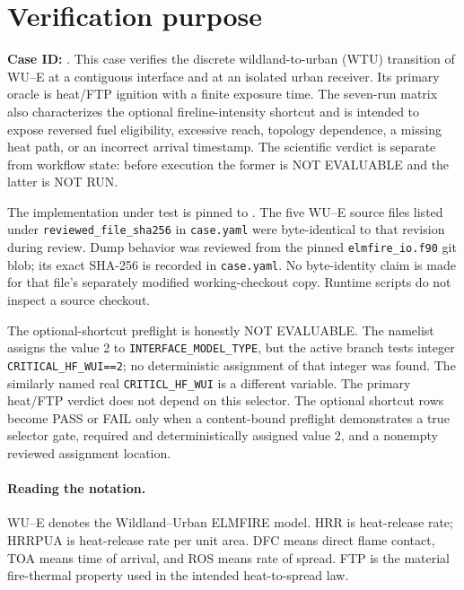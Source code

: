 \section{Verification purpose}

\textbf{Case ID:} \texttt{\CaseID}.  This case verifies the discrete
wildland-to-urban (WTU) transition of WU--E at a contiguous interface and at
an isolated urban receiver. Its primary oracle is heat/FTP ignition with a
finite exposure time. The seven-run matrix also characterizes the optional
fireline-intensity shortcut and is intended to expose reversed fuel
eligibility, excessive reach, topology dependence, a missing heat path, or an
incorrect arrival timestamp. The scientific verdict is separate from workflow state:
before execution the former is NOT EVALUABLE and the latter is NOT RUN.

The implementation under test is pinned to \SourceCommit. The five WU--E source
files listed under \texttt{reviewed\_file\_sha256} in \texttt{case.yaml} were
byte-identical to that revision during review.  Dump behavior was reviewed from
the pinned \texttt{elmfire\_io.f90} git blob; its exact SHA-256 is recorded in
\texttt{case.yaml}.  No byte-identity claim is made for that file's separately
modified working-checkout copy.  Runtime scripts do not inspect a source
checkout.

The optional-shortcut preflight is honestly NOT EVALUABLE. The namelist assigns the
value 2 to \texttt{INTERFACE\_MODEL\_TYPE}, but the active branch tests integer
\texttt{CRITICAL\_HF\_WUI==2}; no deterministic assignment of that integer was
found.  The similarly named real \texttt{CRITICL\_HF\_WUI} is a different
variable. The primary heat/FTP verdict does not depend on this selector. The
optional shortcut rows become PASS or FAIL only when a content-bound preflight
demonstrates a true selector gate, required and deterministically assigned
value 2, and a nonempty reviewed assignment location.


\paragraph{Reading the notation.}
WU--E denotes the Wildland--Urban ELMFIRE model. HRR is heat-release rate;
HRRPUA is heat-release rate per unit area. DFC means direct flame contact,
TOA means time of arrival, and ROS means rate of spread. FTP is the material
fire-thermal property used in the intended heat-to-spread law.

\ReportOverview

